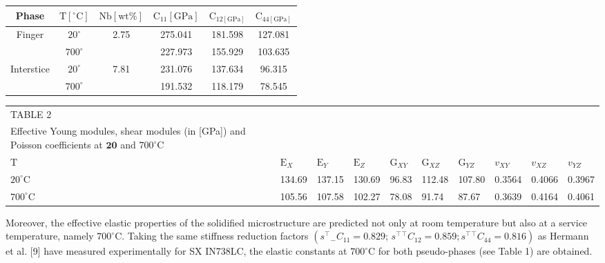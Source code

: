 \documentclass[10pt]{article}
\begin{document}
\begin{center}
\begin{tabular}{|c|c|c|c|c|c|}
\hline
Phase & $\mathrm{T}\left[{ }^{\circ} \mathrm{C}\right]$ & $\mathrm{Nb}[\mathrm{wt} \%]$ & $\mathrm{C}_{11}[\mathrm{GPa}]$ & $\mathrm{C}_{12[\mathrm{GPa}]}$ & $\mathrm{C}_{44[\mathrm{GPa}]}$ \\
\hline
\multirow[t]{2}{*}{Finger} & $20^{\circ}$ & \multirow[t]{2}{*}{2.75} & 275.041 & 181.598 & 127.081 \\
\hline
 & $700^{\circ}$ &  & 227.973 & 155.929 & 103.635 \\
\hline
\multirow[t]{2}{*}{Interstice} & $20^{\circ}$ & \multirow[t]{2}{*}{7.81} & 231.076 & 137.634 & 96.315 \\
\hline
 & $700^{\circ}$ &  & 191.532 & 118.179 & 78.545 \\
\hline
\end{tabular}
\end{center}

\begin{center}
\begin{tabular}{|llllllllll}
\hline
\multicolumn{2}{|l}{TABLE 2} &  &  &  &  &  &  &  &  \\
Effective Young modules, shear modules (in [GPa]) and Poisson coefficients at $\mathbf{2 0}$ and $700^{\circ} \mathrm{C}$ &  &  &  &  &  &  &  &  &  \\
\hline
$\mathrm{T}$ & $\mathrm{E}_{X}$ & $\mathrm{E}_{Y}$ & $\mathrm{E}_{Z}$ & $\mathrm{G}_{X Y}$ & $\mathrm{G}_{X Z}$ & $\mathrm{G}_{Y Z}$ & $v_{X Y}$ & $v_{X Z}$ & $v_{Y Z}$ \\
\hline
$20^{\circ} \mathrm{C}$ & 134.69 & 137.15 & 130.69 & 96.83 & 112.48 & 107.80 & 0.3564 & 0.4066 & 0.3967 \\
\hline
$700^{\circ} \mathrm{C}$ & 105.56 & 107.58 & 102.27 & 78.08 & 91.74 & 87.67 & 0.3639 & 0.4164 & 0.4061 \\
\hline
\end{tabular}
\end{center}

Moreover, the effective elastic properties of the solidified microstructure are predicted not only at room temperature but also at a service temperature, namely $700^{\circ} \mathrm{C}$. Taking the same stiffness reduction factors $\left(s^{\top}{ }_{-} C_{11}=0.829\right.$; $\left.s^{\top}{ }^{\top} C_{12}=0.859 ; s^{\top}{ }^{\top} C_{44}=0.816\right)$ as Hermann et al. [9] have measured experimentally for SX IN738LC, the elastic constants at $700^{\circ} \mathrm{C}$ for both pseudo-phases (see Table 1) are obtained.
\end{document}
